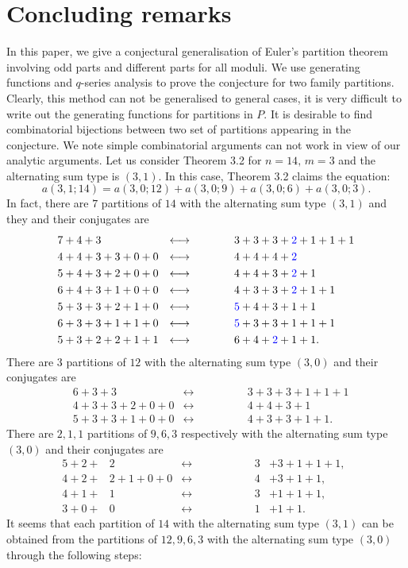 \documentclass[draft]{amsart}
\numberwithin{equation}{section}
\theoremstyle{plain}
\theoremstyle{remark}
\begin{document}
\section{Concluding remarks}
In this paper, we give a conjectural generalisation of Euler's partition theorem involving odd parts and different parts for all moduli. We use generating functions and $q$-series analysis to prove the conjecture for two family partitions. Clearly, this method can not be generalised to general cases, it is very difficult to write out the generating functions for partitions in $P$. It is desirable to find combinatorial bijections between two set of partitions  appearing in the conjecture. We note simple combinatorial arguments can not  work in view of our analytic arguments.  Let us consider Theorem 3.2 for $n=14,\, m=3$ and the alternating sum type is $(3, 1)$.  In this case, Theorem 3.2 claims the equation: 
$$  
a(3, 1;14)=a(3,0; 12)+a(3, 0; 9)+a(3, 0; 6)+a(3, 0; 3).
$$
In fact, there are $7$ partitions of $14$ with the alternating sum type $(3,1)$  and they and their conjugates are
\begin{align*}
&7+4+3 &\longleftrightarrow \quad\quad\quad\quad&3+3+3+{\color{blue} 2}+1+1+1\\
&4+4+3+3+0+0 &\longleftrightarrow\quad\quad\quad\quad &4+4+4+{\color{blue} 2}\\
&5+4+3+2+0+0 &\longleftrightarrow\quad\quad\quad\quad &4+4+3+{\color{blue} 2}+1\\
&6+4+3+1+0+0 &\longleftrightarrow\quad\quad\quad\quad&4+3+3+{\color{blue} 2}+1+1\\
&5+3+3+2+1+0 &\longleftrightarrow\quad\quad\quad\quad &{\color{blue} 5}+4+3+1+1\\
&6+3+3+1+1+0 &\longleftrightarrow\quad\quad\quad\quad &{\color{blue} 5}+3+3+1+1+1\\
&5+3+2+2+1+1 &\longleftrightarrow\quad\quad\quad\quad &6+4+{\color{blue} 2}+1+1.
\end{align*}
There are $3$ partitions of $12$ with the alternating sum type $(3,0)$  and their conjugates are
\begin{align*}
&6+3+3 \quad\quad\quad&\longleftrightarrow\quad\quad\quad\quad &3+3+3+1+1+1\\
&4+3+3+2+0+0 &\longleftrightarrow\quad\quad\quad\quad &4+4+3+1\\
&5+3+3+1+0+0 &\longleftrightarrow\quad\quad\quad\quad &4+3+3+1+1.
\end{align*}
There are $2,1,1$ partitions of $9,6,3$ respectively with the alternating sum type $(3,0)$  and their conjugates are
\begin{align*}
5+2+&2 &\longleftrightarrow& \quad\quad\quad&3&+3+1+1+1,\\
4+2+&2+1+0+0 &\longleftrightarrow&\quad\quad\quad\quad &4&+3+1+1,\,\quad\quad\\
4+1+&1&\longleftrightarrow&\quad\quad\quad\quad&3&+1+1+1,\,\quad\quad\\
3+0+&0&\longleftrightarrow&\quad\quad\quad\quad&1&+1+1.\,\,\,\,\,\quad\quad\quad
\end{align*}
It seems that each partition of $14$  with the alternating sum type $(3,1)$ can be obtained from the partitions of $12,9,6,3$
with the alternating sum type $(3,0)$ through the following steps:
\end{document}
